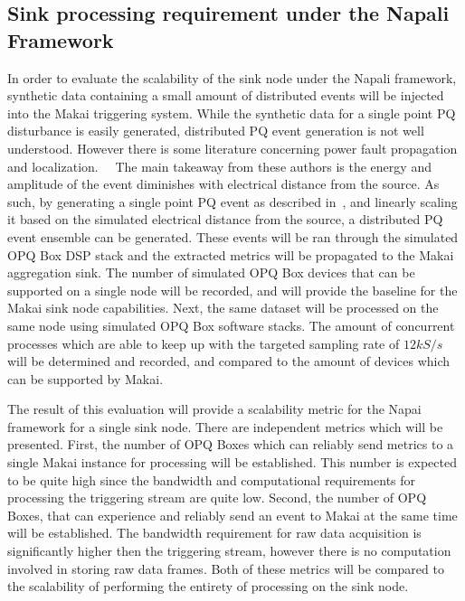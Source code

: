 \subsection{Sink processing requirement under the Napali Framework} \label{iexp:sec:scale}
In order to evaluate the scalability of the sink node under the Napali framework, synthetic data containing a small amount of distributed events will be injected into the Makai triggering system.
While the synthetic data for a single point PQ disturbance is easily generated, distributed PQ event generation is not well understood.
However there is some literature concerning power fault propagation and localization.~\cite{parsons1998direction}~\cite{polajvzer2017evaluation} The main takeaway from these authors is the energy and amplitude of the event diminishes with electrical distance from the source.
As such, by generating a single point PQ event as described in~\cite{kumar2015power}\cite{tan2013simulation}, and linearly scaling it based on the simulated electrical distance from the source, a distributed PQ event ensemble can be generated.
These events will be ran through the simulated OPQ Box DSP stack and the extracted metrics will be propagated to the Makai aggregation sink.
The number of simulated OPQ Box devices that can be supported on a single node will be recorded, and will provide the baseline for the Makai sink node capabilities.
Next, the same dataset will be processed on the same node using simulated OPQ Box software stacks.
The amount of concurrent processes which are able to keep up with the targeted sampling rate of $12kS/s$ will be determined and recorded, and compared to the amount of devices which can be supported by Makai.

The result of this evaluation will provide a scalability metric for the Napai framework for a single sink node.
There are independent metrics which will be presented.
First, the number of OPQ Boxes which can reliably send metrics to a single Makai instance for processing will be established.
This number is expected to be quite high since the bandwidth and computational requirements for processing the triggering stream are quite low.
Second, the number of OPQ Boxes, that can experience and reliably send an event to Makai at the same time will be established.
The bandwidth requirement for raw data acquisition is significantly higher then the triggering stream, however there is no computation involved in storing raw data frames.
Both of these metrics will be compared to the scalability of performing the entirety of processing on the sink node.

